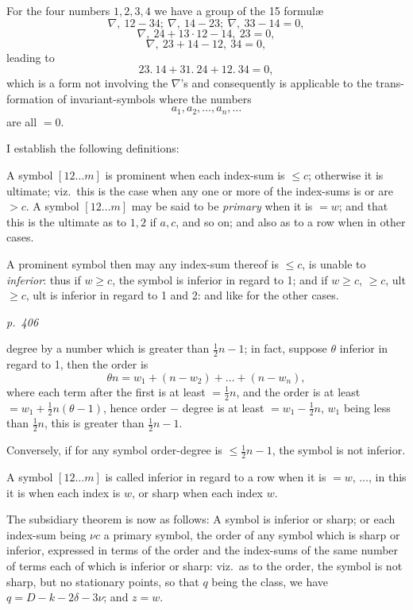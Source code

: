 \documentclass[11pt,a4paper]{book}
\begin{document}
For the four numbers $1, 2, 3, 4$ we have a group of the 15 formul\ae
\[
\nabla,\ 12 - 34;\ \nabla,\ 14 - 23;\ \nabla,\ 33 - 14 = 0,
\]
\[
\nabla,\ 24 + 13 \cdot 12 - 14,\ 23 = 0,
\]
\[
\nabla,\ 23 + 14 - 12,\ 34 = 0,
\]
leading to
\[
23.\ 14 + 31.\ 24 + 12.\ 34 = 0,
\]
which is a form not involving the $\nabla$'s and consequently is applicable to the trans-
formation of invariant-symbols where the numbers
\[
a_1, a_2, \ldots, a_n, \ldots
\]
are all $= 0$.

I establish the following definitions:

A symbol $[12 \ldots m]$ is prominent when each index-sum is $\leq c$; otherwise it is
ultimate; viz.\ this is the case when any one or more of the index-sums is or are $> c$.
A symbol $[12 \ldots m]$ may be said to be \textit{primary} when it is $= w$; and that this is the
ultimate as to $1, 2$ if $a, c$, and so on; and also as to a row when in other cases.

A prominent symbol then may any index-sum thereof is $\leq c$, is unable to
\textit{inferior}: thus if $w \geq c$, the symbol is inferior in regard to 1; and if $w \geq c$,
$\geq c$, ult $\geq c$, ult is inferior in regard to 1 and 2: and like for the other cases.

\clearpage

\bigskip
\textit{p.~406}
\smallskip

\noindent
degree by a number which is greater than $\frac{1}{2}n - 1$; in fact, suppose $\theta$ inferior in
regard to 1, then the order is
\[
\theta n = w_1 + (n - w_2) + \ldots + (n - w_n),
\]
where each term after the first is at least $= \frac{1}{2}n$, and the order is at least
$= w_1 + \frac{1}{2}n(\theta - 1)$, hence order $-$ degree is at least $= w_1 - \frac{1}{2}n$, $w_1$ being less than
$\frac{1}{2}n$, this is greater than $\frac{1}{2}n - 1$.

Conversely, if for any symbol order-degree is $\leq \frac{1}{2}n - 1$, the symbol is not
inferior.

A symbol $[12 \ldots m]$ is called inferior in regard to a row when it is $= w$, $\ldots$, in
this it is when each index is $w$, or sharp when each index $w$.

The subsidiary theorem is now as follows: A symbol is inferior or sharp; or
each index-sum being $\nu c$ a primary symbol, the order of any symbol which is sharp
or inferior, expressed in terms of the order and the index-sums of the same number of
terms each of which is inferior or sharp: viz.\ as to the order, the symbol is not sharp,
but no stationary points, so that $q$ being the class, we have $q = D - k - 2 \delta - 3 \nu$; and
$z = w$.
\end{document}
